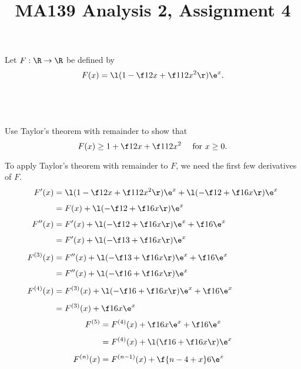 \documentclass[a4paper]{article}
\title{MA139 Analysis 2, Assignment 4}
\begin{document}
\maketitle

\setlength{\parindent}{0em}
\setlength{\parskip}{1em}


\begin{questionbody}
Let $F : \R \to \R$ be defined by \[
F(x) = \l( 1 - \f12 x + \f1{12} x^2 \r) \e^x.
\]
\end{questionbody}

\subsection{~} %

\begin{questionbody}
Use Taylor's theorem with remainder to show that \[
F(x) \ge 1 + \f12 x + \f1{12} x^2 \quad\text{ for } x \ge 0.
\]
\end{questionbody}

To apply Taylor's theorem with remainder to $F$, we need the first few derivatives of $F$.
\begin{align*}
F'(x) &= \l( 1 - \f12 x + \f1{12} x^2 \r) \e^x + \l( - \f12 + \f16 x \r) \e^x \\[1ex]
&= F(x) + \l( - \f12 + \f16 x \r) \e^x \\[1ex]
F''(x) &= F'(x) + \l( - \f12 + \f16 x \r) \e^x + \f16 \e^x \\[1ex]
&= F'(x) + \l( - \f13 + \f16 x \r) \e^x \\[1ex]
F^{(3)}(x) &= F''(x) + \l( - \f13 + \f16 x \r) \e^x + \f16 \e^x \\[1ex]
&= F''(x) + \l( - \f16 + \f16 x \r) \e^x \\[1ex]
F^{(4)}(x) &= F^{(3)}(x) + \l( - \f16 + \f16 x \r) \e^x + \f16 \e^x \\[1ex]
&= F^{(3)}(x) + \f16 x \e^x
\end{align*}
\begin{align*}
F^{(5)} &= F^{(4)}(x) + \f16 x \e^x + \f16 \e^x \\[1ex]
&= F^{(4)}(x) + \l( \f16 + \f16 x \r) \e^x \\[1ex]
F^{(n)}(x) &= F^{(n-1)}(x) + \f{n - 4 + x}6 \e^x
\end{align*}
\end{document}
